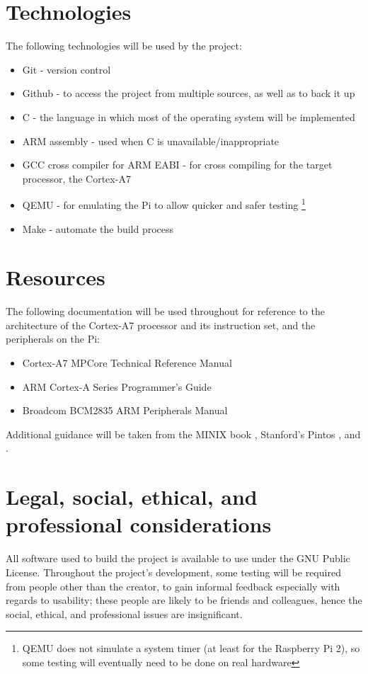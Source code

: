 \documentclass[10pt,a4paper]{article}
\begin{document}

\section*{Technologies}
The following technologies will be used by the project:
\begin{itemize}
    \item Git - version control
    \item Github - to access the project from multiple sources, as well as to
        back it up
    \item C - the language in which most of the operating system will be
        implemented
    \item ARM assembly - used when C is unavailable/inappropriate
        \cite{CannotDoC}
    \item GCC cross compiler for ARM EABI - for cross compiling for the target
        processor, the Cortex-A7 %
    \item QEMU - for emulating the Pi to allow quicker and safer testing
        \footnote{QEMU does not simulate a system timer (at least for the
        Raspberry Pi 2), so some testing will eventually need to be done on real
        hardware}
    \item Make - automate the build process
\end{itemize}

\section*{Resources}
The following documentation will be used throughout for reference to the
architecture of the Cortex-A7 processor and its instruction set, and the
peripherals on the Pi:
\begin{itemize}
    \item Cortex-A7 MPCore Technical Reference Manual
    \item ARM Cortex-A Series Programmer's Guide
    \item Broadcom BCM2835 ARM Peripherals Manual
\end{itemize}

Additional guidance will be taken from the MINIX book \cite{MINIX}, Stanford's
Pintos \cite{Pintos}, and \cite{jsandler}.

\section*{Legal, social, ethical, and professional  considerations}
All software used to build the project is available to use under the GNU Public
License. Throughout the project's development, some testing will be required
from people other than the creator, to gain informal feedback especially with
regards to usability; these people are likely to be friends and colleagues,
hence the social, ethical, and professional issues are insignificant.
\end{document}
